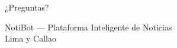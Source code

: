 \documentclass[11pt,aspectratio=169,spanish]{beamer}
\begin{document}
\begin{frame}[plain]
    \begin{center}
        \Huge\textcolor{azul}{¿Preguntas?}

        \vspace{1cm}
        \normalsize
        NotiBot — Plataforma Inteligente de Noticias\\
        Lima y Callao
    \end{center}
\end{frame}
\end{document}
